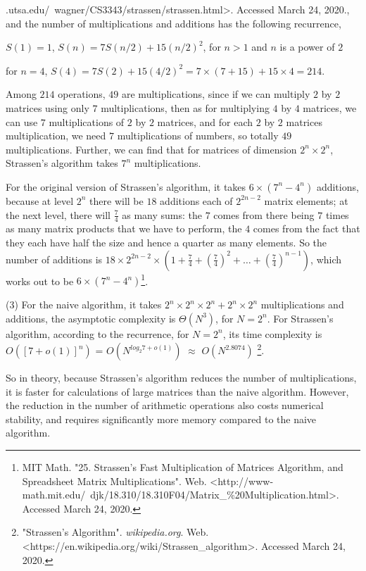 \documentclass[11pt]{article}
\begin{document}
\begin{solution}
{.utsa.edu/~wagner/CS3343/strassen/strassen.html>. Accessed March 24, 2020.}, and the number of multiplications and additions has the following recurrence,
\begin{center}
$S(1) = 1$, $S(n) = 7S(n/2) + 15(n/2)^2$, for $n>1$ and $n$ is a power of $2$
\end{center}
for $n = 4$, $S(4) = 7S(2) + 15(4/2)^2 = 7 \times (7+15) + 15 \times 4 = 214$.
\item Among $214$ operations, $49$ are multiplications, since if we can multiply $2$ by $2$ matrices using only $7$ multiplications, then as for multiplying $4$ by $4$ matrices, we can use $7$ multiplications of $2$ by $2$ matrices, and for each $2$ by $2$ matrices multiplication, we need $7$ multiplications of numbers, so totally $49$ multiplications. Further, we can find that for matrices of dimension $2^n\times2^n$, Strassen's algorithm takes $7^n$ multiplications.
\pagebreak
\item For the original version of Strassen's algorithm, it takes $6 \times (7^n-4^n)$ additions, because at level $2^n$ there will be $18$ additions each of $2^{2n-2}$ matrix elements; at the next level, there will $\frac{7}{4}$ as many sums: the $7$ comes from there being $7$ times as many matrix products that we have to perform, the $4$ comes from the fact that they each have half the size and hence a quarter as many elements. So the number of additions is $18 \times 2^{2n-2} \times (1+ \frac{7}{4} + (\frac{7}{4})^2 + … + (\frac{7}{4})^{n-1})$, which works out to be $6 \times (7^n-4^n)$\footnote{MIT Math. "25. Strassen’s Fast Multiplication of Matrices Algorithm, and Spreadsheet Matrix Multiplications". Web. <http://www-math.mit.edu/~djk/18.310/18.310F04/Matrix\_\%20Multiplication.html>. Accessed March 24, 2020.}.
\item (3) For the naive algorithm, it takes $2^n \times 2^n \times 2^n + 2^n \times 2^n$ multiplications and additions, the asymptotic complexity is $\Theta(N^3)$, for $N = 2^n$. For Strassen's algorithm, according to the recurrence, for $N = 2^n$, its time complexity is  $O([7+o(1)]^n)$ = $O(N^{log_{2}7+o(1)})$ $\approx$ $O(N^{2.8074})$ \footnote{"Strassen's Algorithm". \textit{wikipedia.org}. Web. <https://en.wikipedia.org/wiki/Strassen\_algorithm>. Accessed March 24, 2020.}.
\item So in theory, because Strassen's algorithm reduces the number of multiplications, it is faster for calculations of large matrices than the naive algorithm. However, the reduction in the number of arithmetic operations also costs numerical stability, and requires significantly more memory compared to the naive algorithm.

\end{solution}
\end{document}
